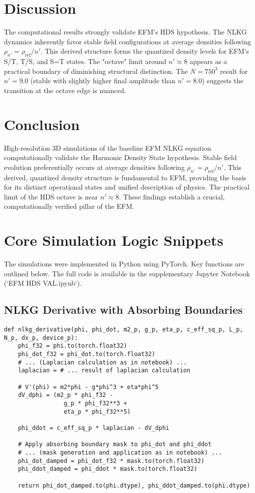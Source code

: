 \documentclass[11pt]{article}
\begin{document}
\section{Discussion}
The computational results strongly validate EFM's HDS hypothesis. The NLKG dynamics inherently favor stable field configurations at average densities following \(\rho_{n'} = \rho_{\text{ref}}/n'\). This derived structure forms the quantized density levels for EFM's S/T, T/S, and S=T states. The "octave" limit around \(n' \approx 8\) appears as a practical boundary of diminishing structural distinction. The \(N=750^3\) result for \(n'=9.0\) (stable with slightly higher final amplitude than \(n'=8.0\)) suggests the transition at the octave edge is nuanced.

\section{Conclusion}
High-resolution 3D simulations of the baseline EFM NLKG equation computationally validate the Harmonic Density State hypothesis. Stable field evolution preferentially occurs at average densities following \(\rho_{n'} = \rho_{\text{ref}}/n'\). This derived, quantized density structure is fundamental to EFM, providing the basis for its distinct operational states and unified description of physics. The practical limit of the HDS octave is near \(n' \approx 8\). These findings establish a crucial, computationally verified pillar of the EFM.

\appendix
\section{Core Simulation Logic Snippets}
\label{app:code}
The simulations were implemented in Python using PyTorch. Key functions are outlined below. The full code is available in the supplementary Jupyter Notebook (`EFM HDS VAL.ipynb`).

\subsection{NLKG Derivative with Absorbing Boundaries}
\begin{lstlisting}[caption=NLKG Derivative Function, label=lst:nlkg_deriv]
def nlkg_derivative(phi, phi_dot, m2_p, g_p, eta_p, c_eff_sq_p, L_p, N_p, dx_p, device_p):
    phi_f32 = phi.to(torch.float32)
    phi_dot_f32 = phi_dot.to(torch.float32)
    # ... (Laplacian calculation as in notebook) ...
    laplacian = # ... result of laplacian calculation
    
    # V'(phi) = m2*phi - g*phi^3 + eta*phi^5
    dV_dphi = (m2_p * phi_f32 - 
                 g_p * phi_f32**3 + 
                 eta_p * phi_f32**5)
    
    phi_ddot = c_eff_sq_p * laplacian - dV_dphi
    
    # Apply absorbing boundary mask to phi_dot and phi_ddot
    # ... (mask generation and application as in notebook) ...
    phi_dot_damped = phi_dot_f32 * mask.to(torch.float32)
    phi_ddot_damped = phi_ddot * mask.to(torch.float32)
    
    return phi_dot_damped.to(phi.dtype), phi_ddot_damped.to(phi.dtype)
\end{lstlisting}
\end{document}
